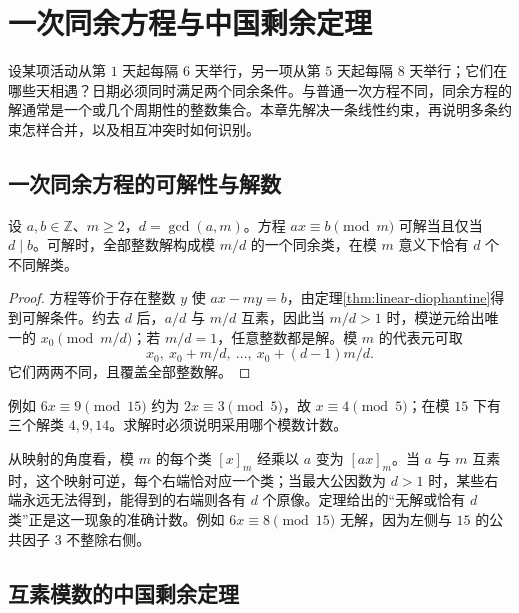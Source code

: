 \setcounter{chapter}{4} %
\chapter{一次同余方程与中国剩余定理}
\label{ch:crt}

设某项活动从第 $1$ 天起每隔 $6$ 天举行，另一项从第 $5$ 天起每隔 $8$ 天举行；它们在哪些天相遇？日期必须同时满足两个同余条件。与普通一次方程不同，同余方程的解通常是一个或几个周期性的整数集合。本章先解决一条线性约束，再说明多条约束怎样合并，以及相互冲突时如何识别。

\section{一次同余方程的可解性与解数}

\begin{theorem}
\label{thm:linear-congruence}
设 $a,b\in\mathbb Z$、$m\ge2$，$d=\gcd(a,m)$。方程 $ax\equiv b\pmod m$ 可解当且仅当 $d\mid b$。可解时，全部整数解构成模 $m/d$ 的一个同余类，在模 $m$ 意义下恰有 $d$ 个不同解类。
\end{theorem}
\begin{proof}
方程等价于存在整数 $y$ 使 $ax-my=b$，由定理\ref{thm:linear-diophantine}得到可解条件。约去 $d$ 后，$a/d$ 与 $m/d$ 互素，因此当 $m/d>1$ 时，模逆元给出唯一的 $x_0\pmod{m/d}$；若 $m/d=1$，任意整数都是解。模 $m$ 的代表元可取
\[
 x_0,\ x_0+m/d,\ \ldots,\ x_0+(d-1)m/d.
\]
它们两两不同，且覆盖全部整数解。
\end{proof}

例如 $6x\equiv9\pmod{15}$ 约为 $2x\equiv3\pmod5$，故 $x\equiv4\pmod5$；在模 $15$ 下有三个解类 $4,9,14$。求解时必须说明采用哪个模数计数。

从映射的角度看，模 $m$ 的每个类 $[x]_m$ 经乘以 $a$ 变为 $[ax]_m$。当 $a$ 与 $m$ 互素时，这个映射可逆，每个右端恰对应一个类；当最大公因数为 $d>1$ 时，某些右端永远无法得到，能得到的右端则各有 $d$ 个原像。定理给出的“无解或恰有 $d$ 类”正是这一现象的准确计数。例如 $6x\equiv8\pmod{15}$ 无解，因为左侧与 $15$ 的公共因子 $3$ 不整除右侧。

\section{互素模数的中国剩余定理}

